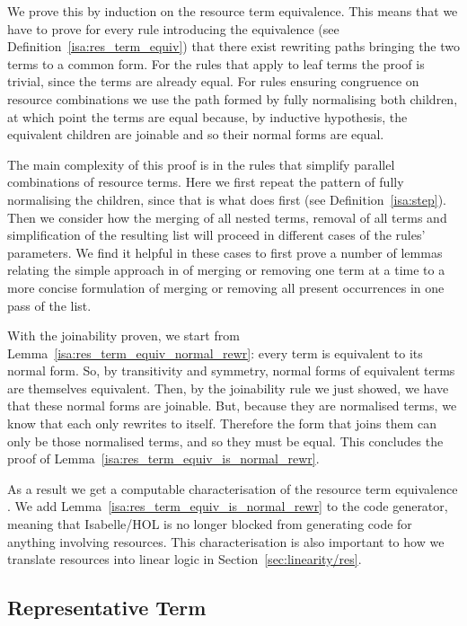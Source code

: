 \documentclass[class=smolathesis,crop=false]{standalone}
\begin{document}
We prove this by induction on the resource term equivalence.
This means that we have to prove for every rule introducing the equivalence (see Definition~\ref{isa:res_term_equiv}) that there exist rewriting paths bringing the two terms to a common form.
For the rules that apply to leaf terms the proof is trivial, since the terms are already equal.
For rules ensuring congruence on resource combinations we use the path formed by fully normalising both children, at which point the terms are equal because, by inductive hypothesis, the equivalent children are joinable and so their normal forms are equal.

The main complexity of this proof is in the rules that simplify parallel combinations of resource terms.
Here we first repeat the pattern of fully normalising the children, since that is what  does first (see Definition~\ref{isa:step}).
Then we consider how the merging of all nested  terms, removal of all  terms and simplification of the resulting list will proceed in different cases of the rules' parameters.
We find it helpful in these cases to first prove a number of lemmas relating the simple approach in  of merging or removing one term at a time to a more concise formulation of merging or removing all present occurrences in one pass of the list.
\cbend

With the joinability proven, we start from Lemma~\ref{isa:res_term_equiv_normal_rewr}: every term is equivalent to its normal form.
So, by transitivity and symmetry, normal forms of equivalent terms are themselves equivalent.
Then, by the joinability rule we just showed, we have that these normal forms are joinable.
But, because they are normalised terms, we know that each only rewrites to itself.
Therefore the form that joins them can only be those normalised terms, and so they must be equal.
This concludes the proof of Lemma~\ref{isa:res_term_equiv_is_normal_rewr}.

As a result we get a computable characterisation of the resource term equivalence \isa{\isasymsim}.
We add Lemma~\ref{isa:res_term_equiv_is_normal_rewr} to the code generator, meaning that Isabelle/HOL is no longer blocked from generating code for anything involving resources.
This characterisation is also important to how we translate resources into linear logic in Section~\ref{sec:linearity/res}.

\subsection{Representative Term}
\label{sec:res/rewr/representative}
\end{document}

